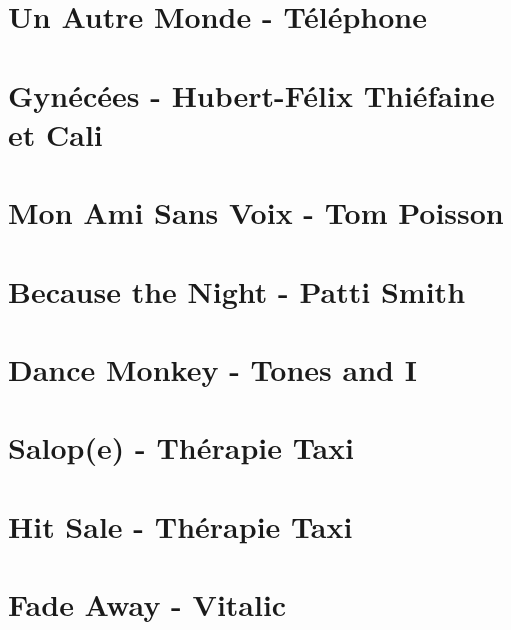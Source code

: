 \documentclass[11pt]{article}
\begin{document}
\section*{Un Autre Monde - Téléphone}

\section{Gynécées - Hubert-Félix Thiéfaine et Cali}
\begin{guitar}

\end{guitar}


\section{Mon Ami Sans Voix - Tom Poisson}
\begin{guitar}

\end{guitar}

\section{Because the Night - Patti Smith}


\section{Dance Monkey - Tones and I}
\begin{guitar}

\end{guitar}

\section{Salop(e) - Thérapie Taxi}
\begin{guitar}

\end{guitar}

\section{Hit Sale - Thérapie Taxi}
\begin{guitar}

\end{guitar}

\section{Fade Away - Vitalic}

\end{document}
